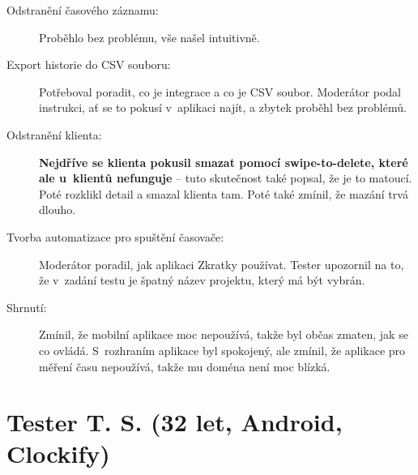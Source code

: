 \begin{description}
\item[Odstranění časového záznamu:] Proběhlo bez problému, vše našel intuitivně.
\item[Export historie do CSV souboru:] Potřeboval poradit, co je integrace a co je CSV soubor. Moderátor podal instrukci, ať se to pokusí v~aplikaci najít, a zbytek proběhl bez problémů.
\item[Odstranění klienta:] \textbf{Nejdříve se klienta pokusil smazat pomocí swipe-to-delete, které ale u~klientů nefunguje} – tuto skutečnost také popsal, že je to matoucí. Poté rozklikl detail a smazal klienta tam. Poté také zmínil, že mazání trvá dlouho.
\item[Tvorba automatizace pro spuštění časovače:] Moderátor poradil, jak aplikaci Zkratky používat. Tester upozornil na to, že v~zadání testu je špatný název projektu, který má být vybrán.
\item[Shrnutí:] Zmínil, že mobilní aplikace moc nepoužívá, takže byl občas zmaten, jak se co ovládá. S~rozhraním aplikace byl spokojený, ale zmínil, že aplikace pro měření času nepoužívá, takže mu doména není moc blízká.
\end{description}

\section*{Tester T. S. (32 let, Android, Clockify)}

